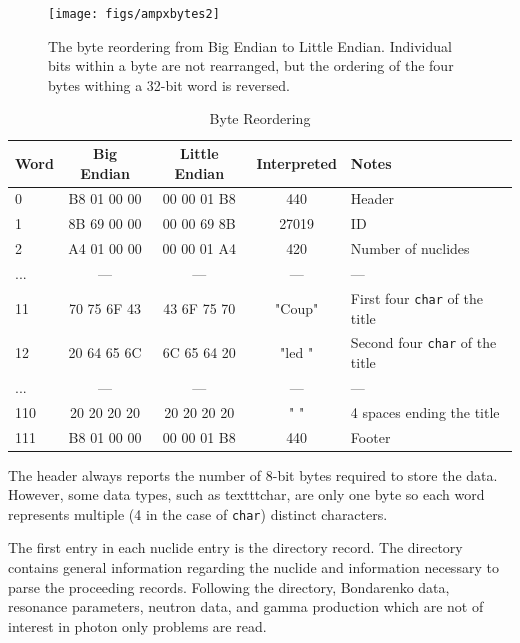 \begin{figure}[tb]
  \begin{center}
   \texttt{[image: figs/ampxbytes2]}
  \end{center}
  \caption{The byte reordering from Big Endian to Little Endian. Individual bits within a byte are not rearranged, but the ordering of the four bytes withing a 32-bit word is reversed.}
\label{fig:ampxbytes2}
\end{figure}

\begin{table}[ht]
\caption{Byte Reordering}
\centering 
\begin{tabular}{l | c | c | c | l}
  \hline \hline   
  Word  & Big Endian & Little Endian & Interpreted & Notes\\ [0.5ex] %
  \hline
  0   & B8 01 00 00 & 00 00 01 B8 & 440    & Header                    \\
  1   & 8B 69 00 00 & 00 00 69 8B & 27019  & ID                        \\
  2   & A4 01 00 00 & 00 00 01 A4 & 420    & Number of nuclides        \\
  ... &      ---    &      ---    &    --- & ---                       \\
  11  & 70 75 6F 43 & 43 6F 75 70 & "Coup" & First four \texttt{char} of the title   \\
  12  & 20 64 65 6C & 6C 65 64 20 & "led " & Second four \texttt{char} of the title  \\
  ... &     ---     &    ---      &  ---   & ---                       \\
  110 & 20 20 20 20 & 20 20 20 20 & "    " & 4 spaces ending the title \\
  111 & B8 01 00 00 & 00 00 01 B8 & 440    & Footer                    \\ 
  [1ex]      %
  \hline
\end{tabular}
\label{tab:reorder}
\end{table}

The header always reports the number of 8-bit bytes required to store the data. However, some data types, such as texttt{char}, are only one byte so each word represents multiple (4 in the case of \texttt{char}) distinct characters.


The first entry in each nuclide entry is the directory record. The directory contains general information regarding the nuclide and information necessary to parse the proceeding records. Following the directory, Bondarenko data, resonance parameters, neutron data, and gamma production which are not of interest in photon only problems are read.

